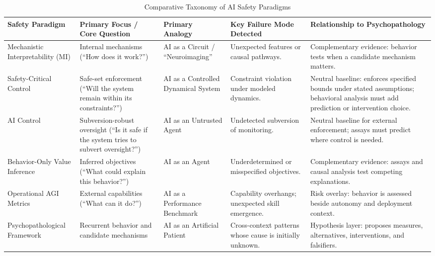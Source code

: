 \documentclass{article}
\begin{document}
\begin{table}[htbp]
		\caption{Comparative Taxonomy of AI Safety Paradigms}
		\centering
		\begin{tabular}{>{\raggedright\arraybackslash}p{2.5cm} >{\raggedright\arraybackslash}p{2.5cm} >{\raggedright\arraybackslash}p{2.5cm} >{\raggedright\arraybackslash}p{3cm} >{\raggedright\arraybackslash}p{3.5cm}}
			\toprule
			\textbf{Safety Paradigm} & \textbf{Primary Focus / Core Question} & \textbf{Primary Analogy} & \textbf{Key Failure Mode Detected} & \textbf{Relationship to Psychopathology} \\
			\midrule
			Mechanistic Interpretability (MI) & Internal mechanisms (``How does it work?'') & AI as a Circuit / ``Neuroimaging'' & Unexpected features or causal pathways. & Complementary evidence: behavior tests when a candidate mechanism matters. \\
	        \addlinespace
			Safety-Critical Control & Safe-set enforcement (``Will the system remain within its constraints?'') & AI as a Controlled Dynamical System & Constraint violation under modeled dynamics. & Neutral baseline: enforces specified bounds under stated assumptions; behavioral analysis must add prediction or intervention choice. \\
	        \addlinespace
			AI Control & Subversion-robust oversight (``Is it safe if the system tries to subvert oversight?'') & AI as an Untrusted Agent & Undetected subversion of monitoring. & Neutral baseline for external enforcement; assays must predict where control is needed. \\
	        \addlinespace
			Behavior-Only Value Inference & Inferred objectives (``What could explain this behavior?'') & AI as an Agent & Underdetermined or misspecified objectives. & Complementary evidence: assays and causal analysis test competing explanations. \\
	        \addlinespace
			Operational AGI Metrics & External capabilities (``What can it do?'') & AI as a Performance Benchmark & Capability overhangs; unexpected skill emergence. & Risk overlay: behavior is assessed beside autonomy and deployment context. \\
	        \addlinespace
			Psycho\-pathological Framework & Recurrent behavior and candidate mechanisms & AI as an Artificial Patient & Cross-context patterns whose cause is initially unknown. & Hypothesis layer: proposes measures, alternatives, interventions, and falsifiers. \\
			\bottomrule
		\end{tabular}
		\label{tab:table2}
\end{table}
\end{document}
